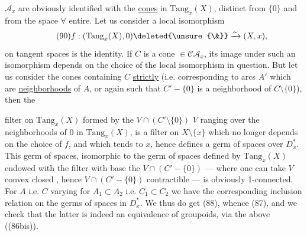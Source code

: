 $\mathcal A_x$ are obviously identified with the \uline{cones}
in $\mathrm{Tang}_x(X)$, 
distinct from $\{0\}$ and from the
 space $\forall$ entire.
Let us consider a local isomorphism
\[
\tag{90}
f:(\mathrm{Tang}_x(X),0)\deleted{\unsure{\&}}
\xrightarrow{\sim}(X,x),
\]
 on tangent spaces is the identity.
 If $C$ is a cone $\in\mathcal C\mathcal A_x$,
its image under such an isomorphism depends on the choice of the local isomorphism in question.
But let us consider the 
 cones
 containing
\deleted{$\unsure{\in}$} $C$ \uline{strictly}
(i.e. corresponding to arcs $A'$ which are \uline{neighborhoods}
of $A$, or again such that $C'-\{0\}$ is a neighborhood of
$C\setminus\{0\}$), then the

filter on $\mathrm{Tang}_x(X)$ formed by the
$V\cap(C'\setminus\{0\})$  $V$
ranging over the neighborhoods of $0$ in $\mathrm{Tang}_x(X)$,
is a filter on $X\setminus\{x\}$ which no longer depends on the choice of $f$,
and which tends to $x$, hence defines a germ of spaces
over  $D_x^*$.
This germ of spaces, 
isomorphic to the germ of spaces defined by $\mathrm{Tang}_x(X)$ endowed with the filter
with base the $V\cap(C'-\{0\})$ --- where one can take $V$
convex closed , hence
$V\cap(C'-\{0\})$ contractible --- is obviously 1-connected.
For $A$ i.e. $C$ varying  for $A_1\subset A_2$
i.e. $C_1\subset C_2$ we have the corresponding inclusion relation
on the germs of spaces in $D_x^*$.
We thus do get (88), whence (87), and we check
that the latter is indeed an equivalence of 
groupoids, via the 
  above ((86bis)).

